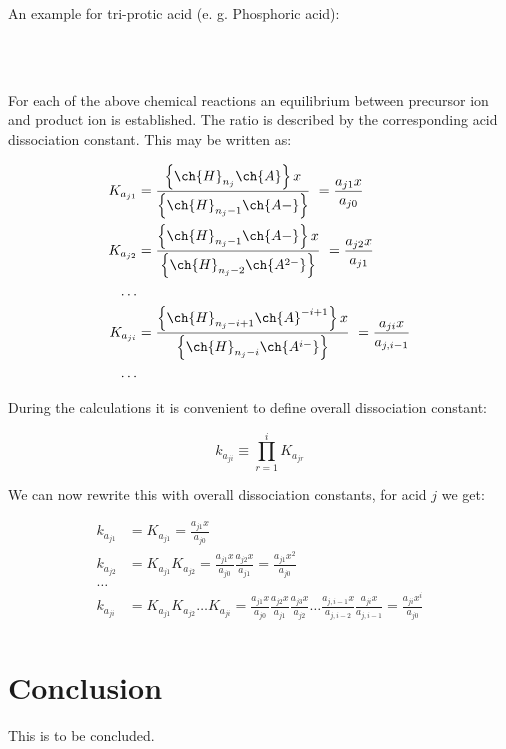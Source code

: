An example for tri-protic acid (e. g. Phosphoric acid):

\vspace{0.3cm}
\begin{center}
    \noindent
     \\
     \\
\end{center}
\vspace{0.5cm}


For each of the above chemical reactions an equilibrium between precursor ion and product ion is established.
The ratio is described by the corresponding acid dissociation constant. This may be written as:

\begin{align*}
    K_{a_{j1}} & = \frac{\left\{\ch{H}_{n_j}\ch{A}\right\}x}{\left\{\ch{H}_{n_j-1}\ch{A-}\right\}}  \
    = \frac{a_{j1}x}{a_{j0}}
    \\
    K_{a_{j2}} & = \frac{\left\{\ch{H}_{n_j-1}\ch{A-}\right\}x}{\left\{\ch{H}_{n_j-2}\ch{A^{2-}}\right\}}   \
    = \frac{a_{j2}x}{a_{j1}}
    \\
    \dots
    \\
    K_{a_{ji}} & = \frac{\left\{\ch{H}_{n_j-i+1}\ch{A}^{-i+1}\right\}x}{\left\{\ch{H}_{n_j-i}\ch{A^{i-}}\right\}} \
    = \frac{a_{ji}x}{a_{j,i-1}}
    \\
    \dots
\end{align*}

During the calculations it is convenient to define overall dissociation constant:

\begin{equation}
    k_{a_{ji}} \equiv \prod_{r=1}^{i} K_{a_{jr}}
\end{equation}

We can now rewrite this with overall dissociation constants, for acid $j$ we get:

\begin{align*}
    k_{a_{j1}} & = K_{a_{j1}} = \frac{a_{j1} x}{a_{j0}}
    \\
    k_{a_{j2}} & = K_{a_{j1}} K_{a_{j2}} = \frac{a_{j1} x} {a_{j0}} \frac{a_{j2}x}{a_{j1}}
    = \frac{a_{j1}x^2}{a_{j0}}
    \\
    \dots                                                                                  \\
    k_{a_{ji}} & = K_{a_{j1}} K_{a_{j2}} \dots K_{a_{ji}}
    = \frac{a_{j1} x} {a_{j0}} \frac{a_{j2}x}{a_{j1}}\frac{a_{j3}x}{a_{j2}} \dots
    \frac{a_{j,i-1}x}{a_{j,i-2}}\frac{a_{ji}x}{a_{j,i-1}}
    = \frac{a_{ji}x^i}{a_{j0}}
    \\
\end{align*}

\section{Conclusion}

This is to be concluded.
